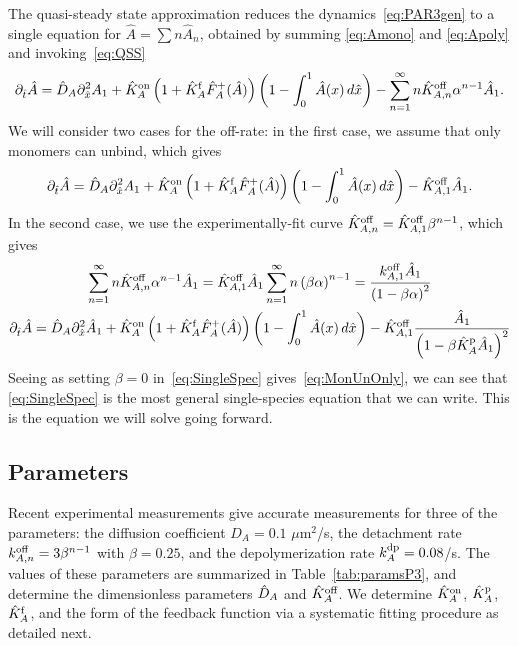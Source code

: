\documentclass[11pt]{article}
\newcommand{\6}[1]{#1_{\text{6}}}
\newcommand{\3}[1]{#1_{\text{3}}}
\begin{document}
The quasi-steady state approximation reduces the dynamics\ \eqref{eq:PAR3gen} to a single equation for $\hat A=\sum n \hat A_n$, obtained by summing \eqref{eq:Amono} and \eqref{eq:Apoly} and invoking\ \eqref{eq:QSS}
\begin{equation}
\partial_{\hat{t}} \hat A = \hat{D}_A \partial_{\hat{x}}^2 A_1+\hat{K}^\text{on}_A \left(1+\hat{K}^\text{f}_A \hat F_A^+(\hat A) \right)\left(1 - \int_0^1 \hat A(x) \, d\hat{x} \right) - \sum_{n=1}^\infty n \hat{K}^\text{off}_{A,n}  \alpha^{n-1} \hat A_1.
\end{equation}
We will consider two cases for the off-rate: in the first case, we assume that only monomers can unbind, which gives \cite[Eq.~(14)]{lang2023oligomerization}
\begin{equation}
\label{eq:MonUnOnly}
\partial_{\hat{t}} \hat A = \hat{D}_A \partial_{\hat{x}}^2 A_1+\hat{K}^\text{on}_A \left(1+\hat{K}^\text{f}_A \hat F_A^+(\hat A) \right)\left(1 - \int_0^1 \hat A(x) \, d\hat{x} \right) - \hat{K}^\text{off}_{A,1}  \hat A_1.
\end{equation}
In the second case, we use the experimentally-fit curve $\hat{K}^\text{off}_{A,n}=\hat{K}^\text{off}_{A,1} \beta^{n-1}$, which gives 
\begin{gather}
\nonumber
\sum_{n=1}^\infty n \hat{K}^\text{off}_{A,n}  \alpha^{n-1} \hat A_1 = \hat{K}^\text{off}_{A,1} \hat A_1 \sum_{n=1}^\infty n \left(\beta \alpha\right)^{n-1}= \frac{k^\text{off}_{A,1} \hat A_1}{\left(1-\beta \alpha\right)^2}\\
\label{eq:SingleSpec}
\partial_{\hat{t}} \hat A = \hat{D}_A \partial_{\hat{x}}^2 \hat A_1+\hat{K}^\text{on}_A \left(1+\hat{K}^\text{f}_A \hat F_A^+(\hat A) \right)\left(1 - \int_0^1 \hat A(x) \, d\hat{x} \right) - \hat{K}^\text{off}_{A,1}  \frac{\hat A_1}{\left(1-\beta \hat{K}^\text{p}_A \hat A_1\right)^2}
\end{gather}
Seeing as setting $\beta=0$ in\ \eqref{eq:SingleSpec} gives\ \eqref{eq:MonUnOnly}, we can see that \eqref{eq:SingleSpec} is the most general single-species equation that we can write. This is the equation we will solve going forward.

\subsection{Parameters \label{sec:paramsP3}}
Recent experimental measurements \cite{lang2023oligomerization} give accurate measurements for three of the parameters: the diffusion coefficient $D_A=0.1$ $\mu$m$^2$/s, the detachment rate $k^\text{off}_{A,n}=3\beta^{n-1}$ with $\beta=0.25$, and the depolymerization rate $k^\text{dp}_A=0.08$/s. The values of these parameters are summarized in Table\ \ref{tab:paramsP3}, and determine the dimensionless parameters $\hat{D}_A$ and $\hat{K}^\text{off}_A$. We determine $\hat{K}^\text{on}_A$, $\hat{K}^\text{p}_A$, $\hat{K}^\text{f}_A$, and the form of the feedback function via a systematic fitting procedure as detailed next.
\end{document}
